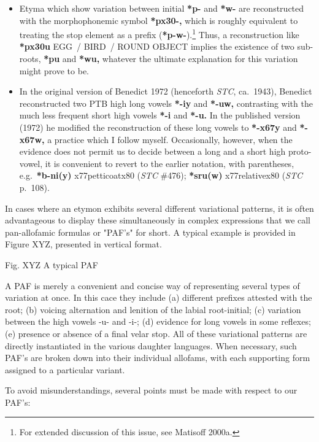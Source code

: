 \begin{itemize}
\item Etyma which show variation between initial \textbf{*p-} and \textbf{*w-} are reconstructed with
the morphophonemic symbol \textbf{*px30-,} which is roughly equivalent to treating the stop
element as a prefix (\textbf{*p-w-}).\footnote{For extended discussion of this issue,
see Matisoff 2000a.}  Thus, a reconstruction like \textbf{*px30u} EGG~/ BIRD~/ ROUND OBJECT
implies the existence of two sub-roots, \textbf{*pu} and \textbf{*wu,} whatever the ultimate
explanation for this variation might prove to be.

\item In the original version of Benedict 1972 (henceforth \textit{STC}, ca.~1943), Benedict reconstructed two PTB high
long vowels \textbf{*-iy} and \textbf{*-uw,} contrasting with the much less frequent short high
vowels \textbf{*-i} and \textbf{*-u.}  In the published version (1972) he modified the
reconstruction of these long vowels to \textbf{*-x67y} and \textbf{*-x67w,} a practice which I follow
myself.  Occasionally, however, when the evidence does not permit us to decide
between a long and a short high proto-vowel, it is convenient to revert to the
earlier notation, with parentheses, e.g.\ \textbf{*b-ni(y)} x77petticoatx80 (\textit{STC} \#476);
\textbf{*sru(w)} x77relativex80 (\textit{STC} p.~108).  
\end{itemize}

In cases where an etymon exhibits several different variational patterns, it is often advantageous to display these simultaneously in complex expressions that we call pan-allofamic formulas or "PAF's" for short. A typical example is provided in Figure XYZ, presented in vertical format.

						
				Fig. XYZ A typical PAF

A PAF is merely a convenient and concise way of representing several types of variation at once. In this cace they include (a) different prefixes attested with the root; (b) voicing alternation and lenition of the labial root-initial; (c) variation between the high vowels -u- and -i-; (d) evidence for long vowels in some reflexes; (e) presence or absence of a final velar stop. All of these variational patterns are directly instantiated in the various daughter languages. When necessary, such PAF's are broken down into their individual allofams, with each supporting form assigned to a particular variant.

To avoid misunderstandings, several points must be made with respect to our PAF's:

